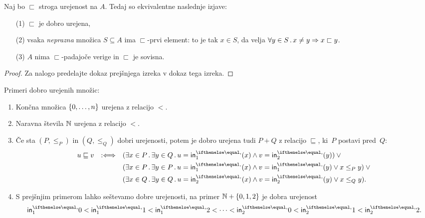 \begin{izrek}
  \label{izr:dobra-urejenost-karakterizacija}
  Naj bo $\sqsubset$ stroga urejenost na $A$. Tedaj so ekvivalentne naslednje izjave:
  \begin{enumerate}
  \item[(1)] $\sqsubset$ je dobro urejena,
  \item[(2)] vsaka \emph{neprazna} množica $S \subseteq A$ ima $\sqsubset$-prvi element: to je tak $x \in S$, da velja
    $\forall y \in S \,.\, x \neq y \Rightarrow x \sqsubset y$.
  \item[(3)] $A$ nima $\sqsubset$-padajoče verige in $\sqsubset$ je sovisna.
  \end{enumerate}
\end{izrek}

\begin{proof}
  Za nalogo predelajte dokaz prejšnjega izreka v dokaz tega izreka.
\end{proof}

\begin{zgled}
  Primeri dobro urejenih množic:
  \begin{enumerate}
  \item Končna množica $\left\{0, \ldots, n\right\}$ urejena z relacijo $<$.

  \item Naravna števila $\mathbb{N}$ urejena z relacijo $<$.

  \item Če sta $(P, \leq_P)$ in $(Q, \leq_Q)$ dobri urejenosti, potem je dobro urejena tudi $P + Q$ z relacijo
    $\sqsubseteq$, ki~$P$ postavi pred~$Q$:
    \begin{equation*}
      u \sqsubseteq v \defiff
      \begin{aligned}[t]
        &(\some{x \in P} \some{y \in Q} u = \inl(x) \land v = \inr(y)) \lor {}\\
        &(\some{x \in P} \some{y \in P} u = \inl(x) \land v = \inl(y) \lor x \leq_P y) \lor {}\\
        &(\some{x \in Q} \some{y \in Q} u = \inr(x) \land v = \inr(y) \lor x \leq_Q y).
      \end{aligned}
    \end{equation*}

  \item
    S prejšnjim primerom lahko seštevamo dobre urejenosti, na primer $\mathbb{N} + \left\{0, 1, 2\right\}$ je dobra
    urejenost
    \begin{equation*}
      \inl{0} < \inl{1} < \inl{2} < \cdots < \inr{0} < \inr{1} < \inr{2}.
    \end{equation*}
  \end{enumerate}
\end{zgled}

